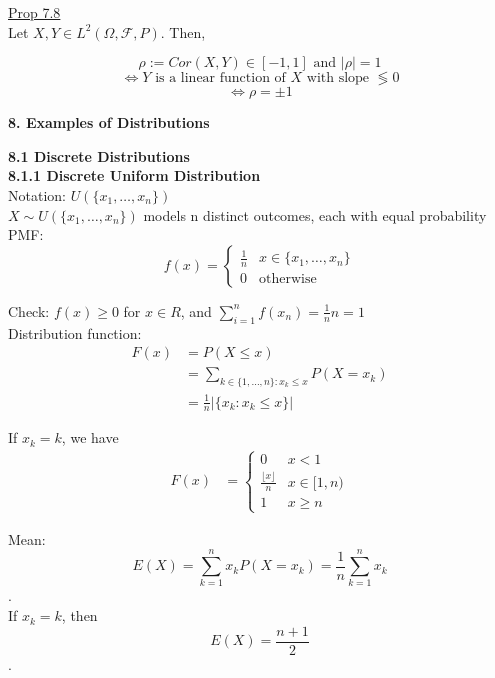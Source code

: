 \documentclass[10pt,letterpaper]{article}
\begin{document}
\underline{Prop 7.8}\\

Let $X, Y\in L^2(\Omega, \mathcal{F}, P)$. Then,
			
				$$\rho:=Cor(X, Y)\in[-1, 1]\mbox{ and }|\rho|=1$$
				$$\iff Y\mbox{ is a linear function of $X$ with slope }\lessgtr0$$
				$$\iff\rho =\pm 1$$

\pagebreak

\begin{center}
\textbf{8. Examples of Distributions}
\end{center}

\textbf{8.1 Discrete Distributions}\\

\textbf{8.1.1 Discrete Uniform Distribution}\\

			Notation: $U(\{x_1, \dots, x_n\})$\\
			
			$X\sim U(\{x_1, \dots, x_n\})$ models n distinct outcomes, each with equal probability \\
			
			PMF: \[f(x)=
						\begin{cases}
							\frac{1}{n}&x\in\{x_1, \dots, x_n\}\\
							0&\mbox{otherwise}
						\end{cases}\]
			
			Check: $f(x)\geq 0$ for $x\in R$, and $\sum_{i=1}^{n}f(x_n)=\frac{1}{n}n=1$\\
			
			Distribution function:
			\begin{align*}
				F(x)&=P(X\leq x)\\
				&=\sum_{k\in\{1, \dots, n\} : x_k\leq x}P(X=x_k)\\
				&=\frac{1}{n}|\{x_k : x_k\leq x\}|
			\end{align*}
			
			If $x_k=k$, we have
			\begin{align*}
				F(x)&=\begin{cases}
					0&x<1\\
					\frac{\lfloor x\rfloor}{n}&x\in[1, n)\\
					1&x\geq n
				\end{cases}
			\end{align*}
			
			Mean: $$E(X)=\sum_{k=1}^{n}x_kP(X=x_k)=\frac{1}{n}\sum_{k=1}^{n}x_k$$.\\
			If $x_k=k$, then $$E(X)=\frac{n+1}{2}$$.\\
\end{document}
